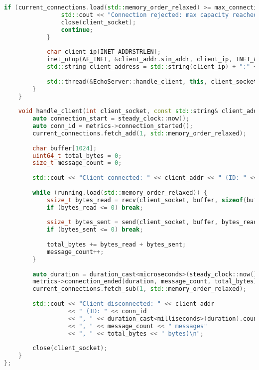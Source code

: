 \begin{lstlisting}[language=C++, caption={Echo Serwer w C++ z jednym wątkiem na połączenie}, label={lst:cpp_echo_server}]
            if (current_connections.load(std::memory_order_relaxed) >= max_connections) {
                std::cout << "Connection rejected: max capacity reached\n";
                close(client_socket);
                continue;
            }
            
            char client_ip[INET_ADDRSTRLEN];
            inet_ntop(AF_INET, &client_addr.sin_addr, client_ip, INET_ADDRSTRLEN);
            std::string client_address = std::string(client_ip) + ":" + std::to_string(ntohs(client_addr.sin_port));
            
            std::thread(&EchoServer::handle_client, this, client_socket, client_address).detach();
        }
    }
    
    void handle_client(int client_socket, const std::string& client_addr) {
        auto connection_start = steady_clock::now();
        auto conn_id = metrics->connection_started();
        current_connections.fetch_add(1, std::memory_order_relaxed);
        
        char buffer[1024];
        uint64_t total_bytes = 0;
        size_t message_count = 0;
        
        std::cout << "Client connected: " << client_addr << " (ID: " << conn_id << ")\n";
        
        while (running.load(std::memory_order_relaxed)) {
            ssize_t bytes_read = recv(client_socket, buffer, sizeof(buffer), 0);
            if (bytes_read <= 0) break;
            
            ssize_t bytes_sent = send(client_socket, buffer, bytes_read, 0);
            if (bytes_sent <= 0) break;
            
            total_bytes += bytes_read + bytes_sent;
            message_count++;
        }
        
        auto duration = duration_cast<microseconds>(steady_clock::now() - connection_start);
        metrics->connection_ended(duration, message_count, total_bytes);
        current_connections.fetch_sub(1, std::memory_order_relaxed);
        
        std::cout << "Client disconnected: " << client_addr 
                  << " (ID: " << conn_id 
                  << ", " << duration_cast<milliseconds>(duration).count() << "ms"
                  << ", " << message_count << " messages"
                  << ", " << total_bytes << " bytes)\n";
        
        close(client_socket);
    }
};
\end{lstlisting}

